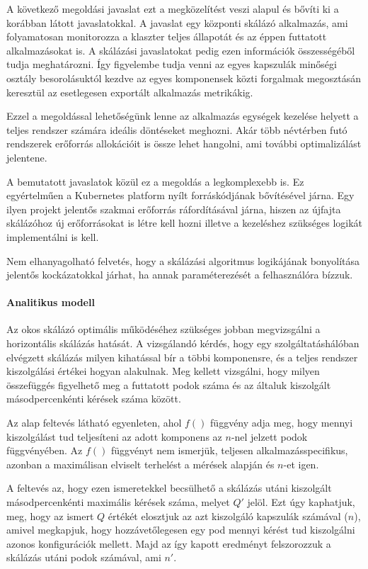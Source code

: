 A következő megoldási javaslat ezt a megközelítést veszi alapul és bővíti ki a korábban látott javaslatokkal.
A javaslat egy központi skálázó alkalmazás, ami folyamatosan monitorozza a klaszter teljes állapotát és az éppen futtatott alkalmazásokat is.
A skálázási javaslatokat pedig ezen információk összességéből tudja meghatározni.
Így figyelembe tudja venni az egyes kapszulák minőségi osztály besorolásuktól kezdve az egyes komponensek közti forgalmak megosztásán keresztül az esetlegesen exportált alkalmazás metrikákig.

Ezzel a megoldással lehetőségünk lenne az alkalmazás egységek kezelése helyett a teljes rendszer számára ideális döntéseket meghozni.
Akár több névtérben futó rendszerek erőforrás allokációit is össze lehet hangolni, ami további optimalizálást jelentene.

A bemutatott javaslatok közül ez a megoldás a legkomplexebb is. 
Ez egyértelműen a Kubernetes platform nyílt forráskódjának bővítésével járna.
Egy ilyen projekt jelentős szakmai erőforrás ráfordításával járna, hiszen az újfajta skálázóhoz új erőforrásokat is létre kell hozni illetve a kezeléshez szükséges logikát implementálni is kell.

Nem elhanyagolható felvetés, hogy a skálázási algoritmus logikájának bonyolítása jelentős kockázatokkal járhat, ha annak paraméterezését a felhasználóra bízzuk.

\paragraph{Analitikus modell}
Az okos skálázó optimális működéséhez szükséges jobban megvizsgálni a horizontális skálázás hatását.
A vizsgálandó kérdés, hogy egy szolgáltatáshálóban elvégzett skálázás milyen kihatással bír a többi komponensre, és a teljes rendszer kiszolgálási értékei hogyan alakulnak.
Meg kellett vizsgálni, hogy milyen összefüggés figyelhető meg a futtatott podok száma és az általuk kiszolgált másodpercenkénti kérések száma között.

Az alap feltevés látható  egyenleten, ahol $f()$ függvény adja meg, hogy mennyi kiszolgálást tud teljesíteni az adott komponens az $n$-nel jelzett podok függvényében.
Az $f()$ függvényt nem ismerjük, teljesen alkalmazásspecifikus, azonban a maximálisan elviselt terhelést a mérések alapján és $n$-et igen.

A feltevés az, hogy ezen ismeretekkel becsülhető a skálázás utáni kiszolgált másodpercenkénti maximális kérések száma, melyet $Q'$ jelöl. 
Ezt úgy kaphatjuk, meg, hogy az ismert $Q$ értékét elosztjuk az azt kiszolgáló kapszulák számával ($n$), amivel megkapjuk, hogy hozzávetőlegesen egy pod mennyi kérést tud kiszolgálni azonos konfigurációk mellett.
Majd az így kapott eredményt felszorozzuk a skálázás utáni podok számával, ami $n'$. 

